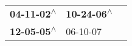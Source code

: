 \begin{supertabular}{lll}
 \textbf{04-11-02\textsuperscript{$\wedge$}} &  \textbf{10-24-06\textsuperscript{$\wedge$}} \\
 \textbf{12-05-05\textsuperscript{$\wedge$}} &                   06-10-07\textsuperscript{} \\
\end{supertabular}
